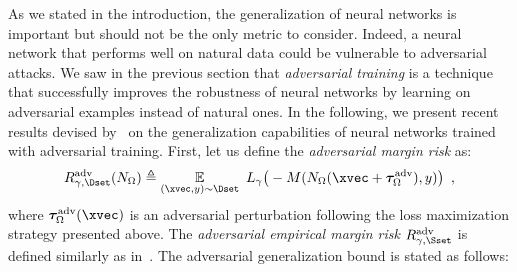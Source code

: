As we stated in the introduction, the generalization of neural networks is important but should not be the only metric to consider.
Indeed, a neural network that performs well on natural data could be vulnerable to adversarial attacks.
We saw in the previous section that \emph{adversarial training} is a technique that successfully improves the robustness of neural networks by learning on adversarial examples instead of natural ones.
In the following, we present recent results devised by~\citet{farnia2018generalizable} on the generalization capabilities of neural networks trained with adversarial training.
First, let us define the \emph{adversarial margin risk} as:
\begin{equation}
  R^{\text{adv}}_{\gamma,\Dset} (N_\Omega) \triangleq \Ebb_{(\xvec, y) \sim \Dset} \ L_\gamma \big(-\margin(N_\Omega(\xvec + \adv^{\text{adv}}_\Omega), y) \big) \enspace,
\end{equation}
where $\adv^{\text{adv}}_\Omega(\xvec)$ is an adversarial perturbation following the loss maximization strategy presented above.
The \emph{adversarial empirical margin risk} $R^{\text{adv}}_{\gamma,\Sset}$ is defined similarly as in~.
The adversarial generalization bound is stated as follows:
